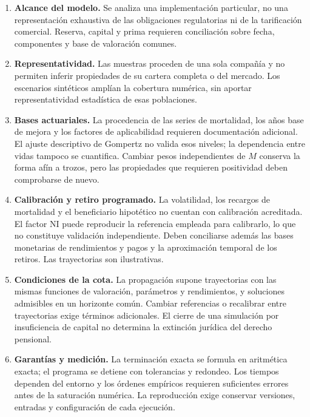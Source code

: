 \begin{enumerate}[leftmargin=*]
  \item \textbf{Alcance del modelo.} Se analiza una implementación particular, no
        una representación exhaustiva de las obligaciones regulatorias ni de la
        tarificación comercial. Reserva, capital y prima requieren conciliación
        sobre fecha, componentes y base de valoración comunes.

  \item \textbf{Representatividad.} Las muestras proceden de una sola compañía y
        no permiten inferir propiedades de su cartera completa o del mercado.
        Los escenarios sintéticos amplían la cobertura numérica, sin aportar
        representatividad estadística de esas poblaciones.

  \item \textbf{Bases actuariales.} La procedencia de las series de mortalidad,
        los años base de mejora y los factores de aplicabilidad requieren
        documentación adicional. El ajuste descriptivo de Gompertz no valida
        esos niveles; la dependencia entre vidas tampoco se cuantifica. Cambiar
        pesos independientes de $M$ conserva la forma afín a trozos, pero las
        propiedades que requieren positividad deben comprobarse de nuevo.

  \item \textbf{Calibración y retiro programado.} La volatilidad, los recargos de
        mortalidad y el beneficiario hipotético no cuentan con calibración
        acreditada. El factor NI puede reproducir la referencia empleada para
        calibrarlo, lo que no constituye validación independiente. Deben
        conciliarse además las bases monetarias de rendimientos y pagos y la
        aproximación temporal de los retiros. Las trayectorias son ilustrativas.

  \item \textbf{Condiciones de la cota.} La propagación supone trayectorias con
        las mismas funciones de valoración, parámetros y rendimientos, y
        soluciones admisibles en un horizonte común. Cambiar referencias o
        recalibrar entre trayectorias exige términos adicionales. El cierre de
        una simulación por insuficiencia de capital no determina la extinción
        jurídica del derecho pensional.

  \item \textbf{Garantías y medición.} La terminación exacta se formula en
        aritmética exacta; el programa se detiene con tolerancias y redondeo.
        Los tiempos dependen del entorno y los órdenes empíricos requieren
        suficientes errores antes de la saturación numérica. La reproducción
        exige conservar versiones, entradas y configuración de cada ejecución.
\end{enumerate}

